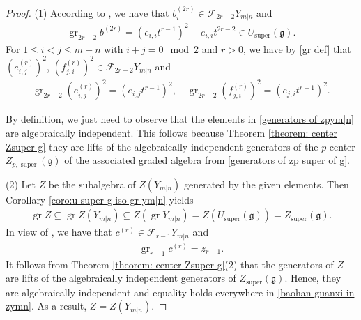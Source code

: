 \documentclass[12pt,reqno]{amsart}
\newcommand{\cF}{\mathcal{F}}
\newcommand{\fg}{\mathfrak{g}}
\DeclareMathOperator{\super}{super}
\DeclareMathOperator{\gr}{gr}
\numberwithin{equation}{section}
\theoremstyle{Theorem}
\theoremstyle{remark}
\numberwithin{equation}{section}
\begin{document}
\begin{proof}
(1) According to \cite[Theorem 5.8]{BT18},   
we have that $b_i^{(2r)}\in\cF_{2r-2}Y_{m|n}$ and 
\begin{align}\label{gr b2r}
 \gr_{2r-2}b^{(2r)}=(e_{i,i}t^{r-1})^2-e_{i,i}t^{2r-2}\in U_{\super}(\fg).   
\end{align}
For $1\leq i<j\leq m+n$ with $\bar i+\bar j=0\!\!\!\mod 2$ and $r>0$,
we have by \eqref{gr def} that $(e_{i,j}^{(r)})^2$, $(f_{j,i}^{(r)})^2\in\cF_{2r-2}Y_{m|n}$ and 
\begin{align}\label{gr eijr2 and fjir2}
\gr_{2r-2}(e_{i,j}^{(r)})^2=(e_{i,j}t^{r-1})^2,\quad \gr_{2r-2}(f_{j,i}^{(r)})^2=(e_{j,i}t^{r-1})^2. 
\end{align}

By definition,
we just need to observe that the elements in \eqref{generators of zpym|n} are algebraically independent.
This follows because Theorem \ref{theorem: center Zsuper g} they are lifts of the algebraically independent generators of the $p$-center $Z_{p,\super}(\fg)$ of the associated graded algebra from \eqref{generators of zp super of g}.

(2) Let $Z$ be the subalgebra of $Z(Y_{m|n})$ generated by the given elements.
Then Corollary \ref{coro:u super g iso gr ym|n} yields
\begin{align}\label{baohan guanxi in zymn}
\gr Z\subseteq \gr Z(Y_{m|n})\subseteq Z(\gr Y_{m|n})=Z(U_{\super}(\fg))=Z_{\super}(\fg).
\end{align}
In view of \cite[Theorem 5.1]{BT18}, we have that $c^{(r)}\in\cF_{r-1}Y_{m|n}$ and 
\begin{align}\label{gr c}
\gr_{r-1}c^{(r)}=z_{r-1}.    
\end{align}
It follows from Theorem \ref{theorem: center Zsuper g}(2) that the generators of $Z$ are lifts of the algebraically independent generators of $Z_{\super}(\fg)$.
Hence, they are algebraically independent and equality holds everywhere in \eqref{baohan guanxi in zymn}. 
As a result, $Z=Z(Y_{m|n})$.
\end{proof}
\end{document}
